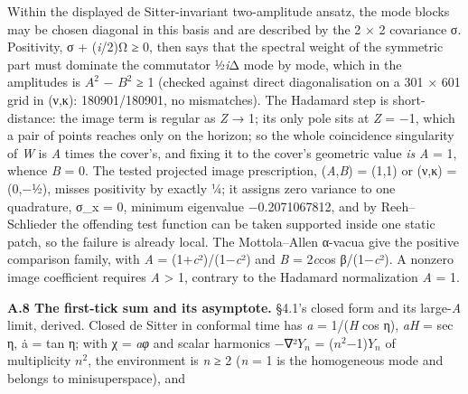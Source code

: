 \documentclass[
]{article}
\begin{document}
Within the displayed de Sitter-invariant two-amplitude ansatz, the mode
blocks may be chosen diagonal in this basis and are described by the 2 ×
2 covariance σ. Positivity, σ + (\emph{i}/2)Ω ≥ 0, then says that the
spectral weight of the symmetric part must dominate the commutator
½\emph{i}Δ mode by mode, which in the amplitudes is \(A^2\) − \(B^2\) ≥
1 (checked against direct diagonalisation on a 301 × 601 grid in (ν,κ):
180901/180901, no mismatches). The Hadamard step is short-distance: the
image term is regular as \emph{Z} → 1; its only pole sits at \emph{Z} =
−1, which a pair of points reaches only on the horizon; so the whole
coincidence singularity of \emph{W} is \emph{A} times the cover's, and
fixing it to the cover's geometric value \emph{is} \emph{A} = 1, whence
\emph{B} = 0. The tested projected image prescription,
(\emph{A},\emph{B}) = (1,1) or (ν,κ) = (0,−½), misses positivity by
exactly ¼; it assigns zero variance to one quadrature, σ\_x = 0, minimum
eigenvalue −0.2071067812, and by Reeh--Schlieder the offending test
function can be taken supported inside one static patch, so the failure
is already local. The Mottola--Allen α-vacua give the positive
comparison family, with \emph{A} =
(1+\textbar{}\emph{c}\textbar²)/(1−\textbar{}\emph{c}\textbar²) and
\emph{B} = 2\textbar{}\emph{c}\textbar cos
β/(1−\textbar{}\emph{c}\textbar²). A nonzero image coefficient requires
\emph{A} \textgreater{} 1, contrary to the Hadamard normalization
\emph{A} = 1.

\textbf{A.8 The first-tick sum and its asymptote.} §4.1's closed form
and its large-\emph{A} limit, derived. Closed de Sitter in conformal
time has \emph{a} = 1/(\emph{H} cos η), \emph{aH} = sec η, ȧ = tan η;
with χ = \emph{aφ} and scalar harmonics −∇²\(Y_{n}\) =
(\(n^2\)−1)\(Y_{n}\) of multiplicity \(n^2\), the environment is
\emph{n} ≥ 2 (\emph{n} = 1 is the homogeneous mode and belongs to
minisuperspace), and
\end{document}

